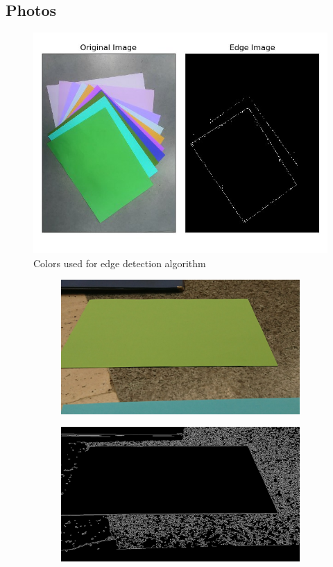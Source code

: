 \documentclass[a4paper,12pt]{article}
\begin{document}
\begin{appendices}
\section{Photos}
\begin{figure}[h]
	\includegraphics[width=.4\textwidth,center]{tried-colors.jpg}
	\caption{Colors used for edge detection algorithm}\label{triedcolors}
\end{figure}
\begin{figure}[H]
		\centering
		\begin{subfigure}{.5\textwidth}
	  		\centering
	  		\includegraphics[width=.85\textwidth]{green-shadow-2.jpg}
		\end{subfigure}%
		\begin{subfigure}{.5\textwidth}
	  		\centering
			\includegraphics[width=.85\textwidth]{green-shadow-2-canny-processed-1.jpg}
		\end{subfigure}

\end{figure}
\end{appendices}
\end{document}

